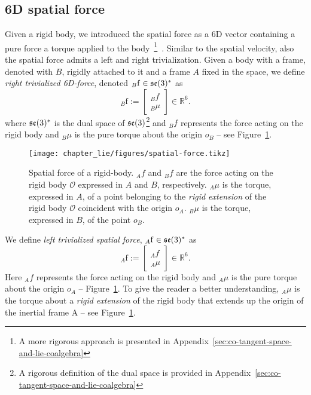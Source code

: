 \subsection{6D spatial force\label{sec:6d-spatial-force}}
Given a rigid body, we introduced the spatial force as a 6D vector containing a pure force a torque applied to the body~\footnote{A more rigorous approach is presented in Appendix~\ref{sec:co-tangent-space-and-lie-coalgebra}}~\citep[Chapter 2.5]{traversaro2017}. Similar to the spatial velocity, also the spatial force admits a left and right trivialization. Given a body with a frame, denoted with $B$, rigidly attached to it and a frame $A$ fixed in the space, we define \emph{right trivialized 6D-force}, denoted ${}_B \mathrm{f} \in \mathfrak{se}(3)^*$ as 
\begin{equation}
    {}_B \mathrm{f} := 
    \begin{bmatrix}
       {}_B f \\
       {}_B \mu
    \end{bmatrix} \in \mathbb{R}^6.
\end{equation}
where $\mathfrak{se}(3)^*$ is the dual space of $\mathfrak{se}(3)$\footnote{A rigorous definition of the dual space is provided in Appendix~\ref{sec:co-tangent-space-and-lie-coalgebra}} and ${}_B f$ represents the force acting on the rigid body and ${}_B \mu$ is the pure torque about the origin $o_B$ -- see Figure~\ref{fig:spatial-force}.
\begin{figure}[tpb]
    \centering
	\texttt{[image: chapter\_lie/figures/spatial-force.tikz]}
	\caption[Spatial force of a rigid-body.]{Spatial force of a rigid-body. ${}_A f$ and ${}_B f$ are the force acting on  the rigid body $\mathcal{O}$ expressed in $A$ and $B$, respectively. ${}_A \mu$ is the torque, expressed in $A$, of a point belonging to the \emph{rigid extension} of the rigid body $\mathcal{O}$ coincident with the origin $o_A$. ${}_B \mu$ is the torque, expressed in $B$, of the point $o_B$.
	\label{fig:spatial-force}}
\end{figure}
We define \emph{left trivialized spatial force}, ${}_A \mathrm{f}\in  \mathfrak{se}(3)^*$ as 
\begin{equation}
    {}_A \mathrm{f} := 
    \begin{bmatrix}
       {}_A f \\
       {}_A \mu
    \end{bmatrix} \in \mathbb{R}^6.
\end{equation}
Here ${}_A f$ represents the force acting on the rigid body and ${}_A \mu$ is the pure torque about the origin $o_A$ -- Figure~\ref{fig:spatial-force}. To give the reader a better understanding, ${}_A \mu$ is the torque about a \emph{rigid extension} of the rigid body that extends up the origin of the inertial frame A -- see Figure~\ref{fig:spatial-force}.

